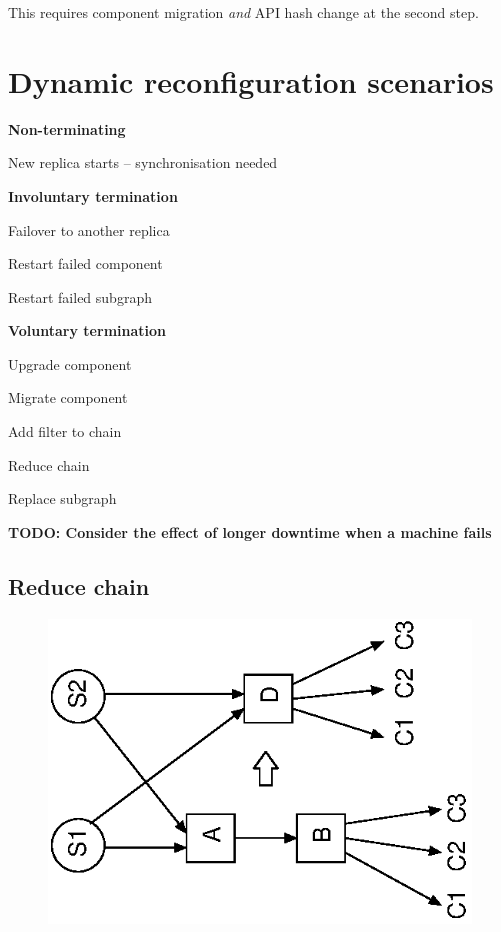 \documentclass[12pt,a4paper,twoside]{article}
\renewcommand{\_}{\texttt{\symbol{95}}}
\newcommand{\todo}[1]{\textbf{TODO: #1}}
\begin{document}
This requires component migration \textit{and} API hash change
at the second step.

\section{Dynamic reconfiguration scenarios}

\textbf{Non-terminating}
\begin{bulletlist}
\item New replica starts -- synchronisation needed
\end{bulletlist}

\textbf{Involuntary termination}
\begin{bulletlist}
\item Failover to another replica
\item Restart failed component
\item Restart failed subgraph
\end{bulletlist}

\textbf{Voluntary termination}
\begin{bulletlist}
\item Upgrade component
\item Migrate component
\item Add filter to chain
\item Reduce chain
\item Replace subgraph
\end{bulletlist}

\todo{Consider the effect of longer downtime when a machine fails}

\subsection{Reduce chain}

\begin{figure}[h]
\centering
\includegraphics[scale=1.0,angle=-90]{diagrams/reduce.eps}
\end{figure}
\end{document}
